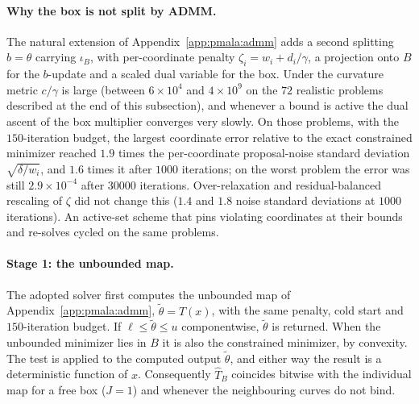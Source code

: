 \paragraph{Why the box is not split by ADMM.} The natural extension of Appendix~\ref{app:pmala:admm} adds a second splitting $b = \theta$ carrying $\iota_B$, with per-coordinate penalty $\zeta_i = w_i + d_i/\gamma$, a projection onto $B$ for the $b$-update and a scaled dual variable for the box. Under the curvature metric $c/\gamma$ is large (between $6\times10^4$ and $4\times10^9$ on the $72$ realistic problems described at the end of this subsection), and whenever a bound is active the dual ascent of the box multiplier converges very slowly. On those problems, with the $150$-iteration budget, the largest coordinate error relative to the exact constrained minimizer reached $1.9$ times the per-coordinate proposal-noise standard deviation $\sqrt{\delta/w_i}$, and $1.6$ times it after $1000$ iterations; on the worst problem the error was still $2.9\times10^{-4}$ after $30000$ iterations. Over-relaxation and residual-balanced rescaling of $\zeta$ \citep[Sec.~3.4.1]{boyd2011distributed} did not change this ($1.4$ and $1.8$ noise standard deviations at $1000$ iterations). An active-set scheme that pins violating coordinates at their bounds and re-solves cycled on the same problems.

\paragraph{Stage 1: the unbounded map.} The adopted solver first computes the unbounded map of Appendix~\ref{app:pmala:admm}, $\tilde\theta = T(x)$, with the same penalty, cold start and $150$-iteration budget. If $\ell \le \tilde\theta \le u$ componentwise, $\tilde\theta$ is returned. When the unbounded minimizer lies in $B$ it is also the constrained minimizer, by convexity. The test is applied to the computed output $\tilde\theta$, and either way the result is a deterministic function of $x$. Consequently $\widehat T_B$ coincides bitwise with the individual map for a free box ($J = 1$) and whenever the neighbouring curves do not bind.

